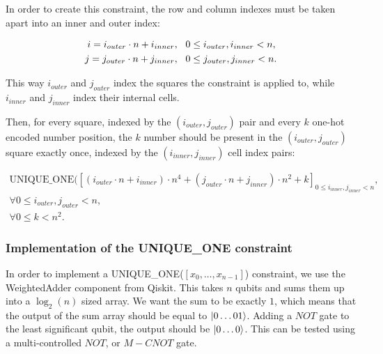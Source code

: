 In order to create this constraint, the row and column indexes must be taken apart into an inner and outer index:

\begin{align*}
i = i_{outer}\cdot{}n + i_{inner},\hspace{3mm}& 0\leq{}i_{outer},i_{inner}<n, \\
j = j_{outer}\cdot{}n + j_{inner},\hspace{3mm}& 0\leq{}j_{outer},j_{inner}<n. \\
\end{align*}

This way $i_{outer}$ and $j_{outer}$ index the squares the constraint is applied to, while $i_{inner}$ and $j_{inner}$ index their internal cells.

Then, for every square, indexed by the $(i_{outer}, j_{outer})$ pair and every $k$ one-hot encoded number position, the $k$ number should be present in the $(i_{outer}, j_{outer})$ square exactly once, indexed by the $(i_{inner}, j_{inner})$ cell index pairs:

\begin{align*}
    \text{UNIQUE\_ONE}([(i_{outer}\cdot{}n + i_{inner})\cdot{}n^4 + (j_{outer}\cdot{}n + j_{inner})\cdot{}n^2 + k]_{0\leq{}i_{inner},j_{inner}<n},\\
\forall{}0\leq{}i_{outer},j_{outer}<n,\\
\forall{}0\leq{}k<n^2.
\end{align*}

\subsubsection{Implementation of the UNIQUE\_ONE constraint}

In order to implement a UNIQUE\_ONE($[x_0,\dots,{}x_{n-1}]$) constraint, we use the WeightedAdder component from Qiskit. This takes $n$ qubits and sums them up into a $\log_{2}(n)$ sized array. We want the sum to be exactly $1$, which means that the output of the sum array should be equal to $\ket{0\dots{}01}$. Adding a $NOT$ gate to the least significant qubit, the output should be $\ket{0\dots{}0}$. This can be tested using a multi-controlled $NOT$, or $M-CNOT$ gate.

